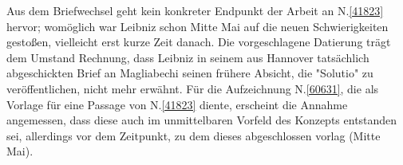 \begin{ledgroup}
Aus dem Briefwechsel geht kein konkreter Endpunkt der Arbeit an N.\;\ref{41823} hervor; womöglich war Leibniz schon Mitte Mai auf die neuen Schwierigkeiten gestoßen, vielleicht erst kurze Zeit danach.
Die vorgeschlagene Datierung trägt dem Umstand Rechnung, dass Leibniz in seinem aus Hannover tatsächlich abgeschickten \cite{02162}Brief an Magliabechi seinen frühere Absicht, die "Solutio" zu veröffentlichen, nicht mehr erwähnt.
\pend
\pstart
Für die Aufzeichnung N.\;\ref{60631}, die als Vorlage für eine Passage von N.\;\ref{41823} diente, erscheint die Annahme angemessen, dass diese auch im unmittelbaren Vorfeld des Konzepts entstanden sei, allerdings vor dem Zeitpunkt, zu dem dieses abgeschlossen vorlag (Mitte Mai).
\pend
\end{ledgroup}
